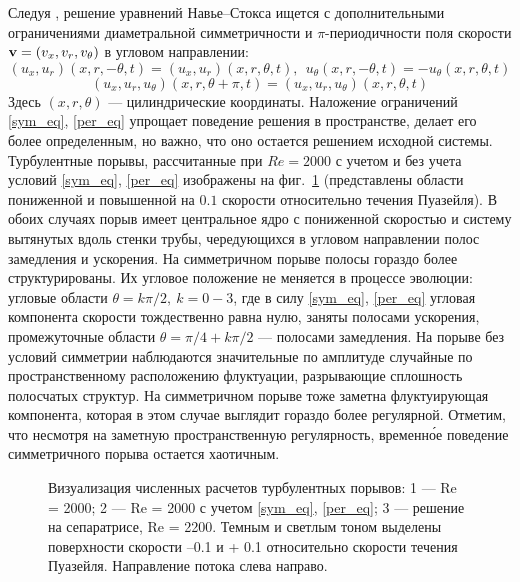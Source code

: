 Следуя \cite{Avila2013}, решение уравнений Навье--Стокса ищется с дополнительными ограничениями диаметральной симметричности и $\pi$-периодичности поля скорости $\mathbf{v} = (v_x, v_r, v_\theta)$ в угловом направлении:
\begin{equation}\label{sym_eq}
(u_x,u_r)(x,r,-\theta,t)=(u_x,u_r)(x,r,\theta,t),\ \ u_\theta(x,r,-\theta,t)=-u_\theta(x,r,\theta,t)
\end{equation}
\begin{equation}\label{per_eq}
(u_x,u_r,u_\theta)(x,r,\theta+\pi,t) = (u_x,u_r,u_\theta)(x,r,\theta,t)
\end{equation}
Здесь $(x, r, \theta)$ --- цилиндрические координаты. Наложение ограничений \eqref{sym_eq}, \eqref{per_eq} упрощает поведение решения в пространстве, делает его более определенным, но важно, что оно остается решением исходной системы. Турбулентные порывы, рассчитанные при $Re=2000$ с учетом и без учета условий \eqref{sym_eq}, \eqref{per_eq} изображены на фиг.~\ref{3D_img} (представлены области пониженной и повышенной на $0.1$ скорости относительно течения Пуазейля). В обоих случаях порыв имеет центральное ядро с пониженной скоростью и систему вытянутых вдоль стенки трубы, чередующихся в угловом направлении полос замедления и ускорения. На симметричном порыве полосы гораздо более структурированы. Их угловое положение не меняется в процессе эволюции: угловые области $\theta=k\pi/2,\ k=0-3$, где в силу \eqref{sym_eq}, \eqref{per_eq} угловая компонента скорости тождественно равна нулю, заняты полосами ускорения, промежуточные области $\theta=\pi/4+k\pi/2$ --- полосами замедления. На порыве без условий симметрии наблюдаются значительные по амплитуде случайные по пространственному расположению флуктуации, разрывающие сплошность полосчатых структур. На симметричном порыве тоже заметна флуктуирующая компонента, которая в этом случае выглядит гораздо более регулярной. Отметим, что несмотря на заметную пространственную регулярность, временн\'{о}е поведение симметричного порыва остается хаотичным.


\begin{figure}[h]
\caption{Визуализация численных расчетов турбулентных порывов: 1 --- Re = 2000; 2 --- Re = 2000 с учетом \eqref{sym_eq}, \eqref{per_eq}; 3 --- решение на сепаратрисе, Re = 2200. Темным и светлым тоном выделены поверхности скорости –0.1 и + 0.1 относительно скорости течения Пуазейля. Направление потока слева направо.}
\label{3D_img}
\end{figure}

